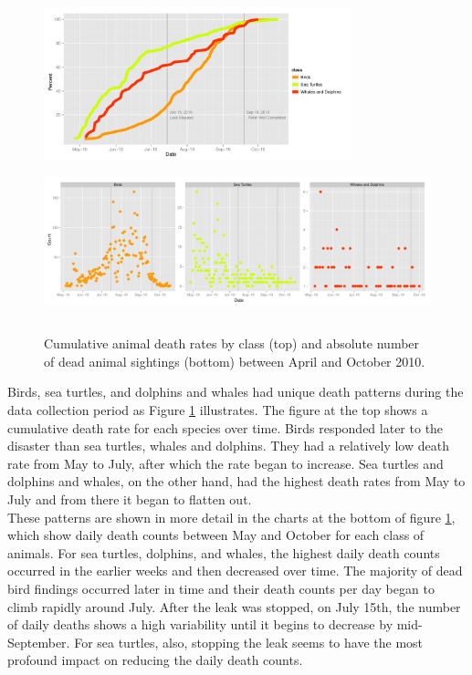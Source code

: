 \documentclass[authoryear,12pt]{elsarticle}
\begin{document}
\begin{figure}[htbp] %
   \centering
   \includegraphics[height=1.75in]{death-rates.pdf} 
    \includegraphics[height=1.75in]{daily-death-counts.pdf}
   \caption{Cumulative animal death rates by class  (top) and absolute number of dead animal sightings (bottom) between April and October 2010.\newline}
   \label{death rates}
\end{figure}


Birds, sea turtles, and dolphins and whales had unique death patterns during the data collection period as Figure \ref{death rates}  illustrates. The figure at the top shows a cumulative death rate for each species over time. Birds responded later to the disaster than sea turtles, whales and dolphins. They had a relatively low death rate from May to July, after which the rate began to increase. Sea turtles and dolphins and whales, on the other hand, had the highest death rates from May to July and from there it began to flatten out. \\
These patterns are shown in more detail in  the charts at the bottom of figure \ref{death rates}, which show daily death counts between May and October for each class of animals. For sea turtles, dolphins, and whales, the highest daily death counts occurred in the earlier weeks and then decreased over time.  The majority of dead bird findings occurred later in time and their death counts per day began to climb rapidly around July. After the leak was stopped, on July 15th, the number of daily deaths shows a high variability until it begins to decrease by mid-September. For sea turtles, also, stopping the leak seems to have the most profound impact on reducing the daily death counts. 
\end{document}
